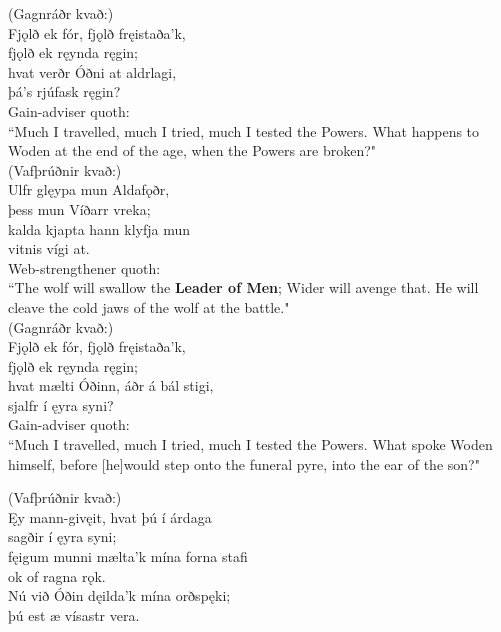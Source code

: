 (Gagnráðr kvað:) \\%
\bva Fjǫlð ek fór, \hld fjǫlð fręistaða'k, \\%
fjǫlð ek ręynda ręgin; \\%
hvat verðr Óðni \hld at aldrlagi, \\%
þá's rjúfask ręgin?\\%

\bvb Gain-adviser quoth: \\ “Much I travelled, much I tried, much I tested the Powers. What happens to Woden at the end of the age, when the Powers are broken?" \\

(Vafþrúðnir kvað:) \\%
\bva Ulfr glęypa \hld mun Aldafǫðr, \\%
þess mun Víðarr vreka; \\%
kalda kjapta \hld hann klyfja mun \\%
vitnis vígi at.\\%

\bvb Web-strengthener quoth: \\ “The wolf will swallow the \textbf{Leader of Men}; Wider will avenge that. He will cleave the cold jaws of the wolf at the battle." \\

(Gagnráðr kvað:) \\%
\bva Fjǫlð ek fór, \hld fjǫlð fręistaða'k, \\%
fjǫlð ek ręynda ręgin; \\%
hvat mælti Óðinn, \hld áðr á bál stigi, \\%
sjalfr í ęyra syni?\\%

\bvb Gain-adviser quoth: \\ “Much I travelled, much I tried, much I tested the Powers. What spoke Woden himself, before [he]\footnotemark[115] would step onto the funeral pyre, into the ear of the son?" \\

(Vafþrúðnir kvað:) \\%
\bva Ęy mann-gi\footnotemark[40] vęit, \hld hvat þú í árdaga \\%
sagðir í ęyra syni; \\%
fęigum munni \hld mælta'k mína forna stafi \\%
ok of ragna rǫk. \\%
Nú við Óðin \hld dęilda'k mína orðspęki; \\%
þú est æ vísastr vera.\\%

